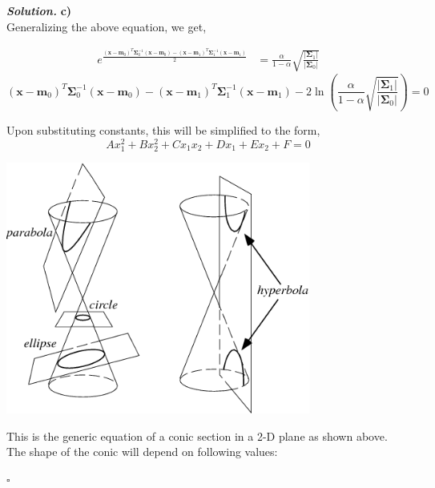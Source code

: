 \documentclass[8pt]{article}
\newenvironment{solution}[1][\it{Solution}]{\textbf{#1. } }{$\square$}
\begin{document}
\begin{solution}
\textbf{c)}\\

Generalizing the above equation, we get,

\begin{align*}
e^{\frac{\left(\mathbf{x} - \mathbf{m}_{0}\right)^{T} \mathbf{\Sigma}_{0}^{-1}\left(\mathbf{x}-\mathbf{m}_{0}\right) - \left(\mathbf{x}-\mathbf{m}_{1}\right)^{T} \mathbf{\Sigma}_{1}^{-1}\left(\mathbf{x}-\mathbf{m}_{1}\right)}{2}}&=\frac{\alpha}{1 - \alpha} \sqrt{\frac{\left|\mathbf{\Sigma}_{1}\right|}{\left|\mathbf{\Sigma}_{0}\right|}}
\end{align*}
$$
\left(\mathbf{x} - \mathbf{m}_{0}\right)^{T} \mathbf{\Sigma}_{0}^{-1}\left(\mathbf{x}-\mathbf{m}_{0}\right) - \left(\mathbf{x}-\mathbf{m}_{1}\right)^{T} \mathbf{\Sigma}_{1}^{-1}\left(\mathbf{x}-\mathbf{m}_{1}\right) - 2 \ln\left(\frac{\alpha}{1 - \alpha} \sqrt{\frac{\left|\mathbf{\Sigma}_{1}\right|}{\left|\mathbf{\Sigma}_{0}\right|}}\right)= 0
$$

Upon substituting constants, this will be simplified to the form,
$$
\boxed{Ax_1^2+Bx_2^2+Cx_1x_2+Dx_1+Ex_2+F = 0}
$$

\begin{center}
\includegraphics[width=10cm, keepaspectratio]{ConicSection}
\end{center}

This is the generic equation of a conic section in a 2-D plane as shown above. The shape of the conic will depend on following values:


\end{solution}
\end{document}
